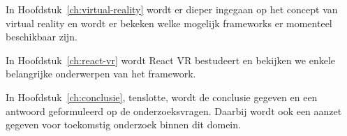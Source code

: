 
In Hoofdstuk~\ref{ch:virtual-reality} wordt er dieper ingegaan op het concept van virtual reality en wordt er bekeken welke mogelijk frameworks er momenteel beschikbaar zijn.

In Hoofdstuk~\ref{ch:react-vr} wordt React VR bestudeert en bekijken we enkele belangrijke onderwerpen van het framework.

In Hoofdstuk~\ref{ch:conclusie}, tenslotte, wordt de conclusie gegeven en een antwoord geformuleerd op de onderzoeksvragen. Daarbij wordt ook een aanzet gegeven voor toekomstig onderzoek binnen dit domein.

